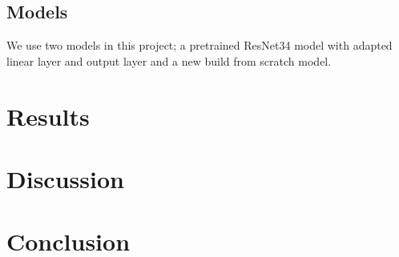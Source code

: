 \documentclass{article}
\begin{document}
\subsection{Models}
We use two models in this project; a pretrained ResNet34 model \citep{he2016deep} with adapted linear layer and output layer and a new build from scratch model.

\section{Results}
\section{Discussion}
\section{Conclusion}





\end{document}

